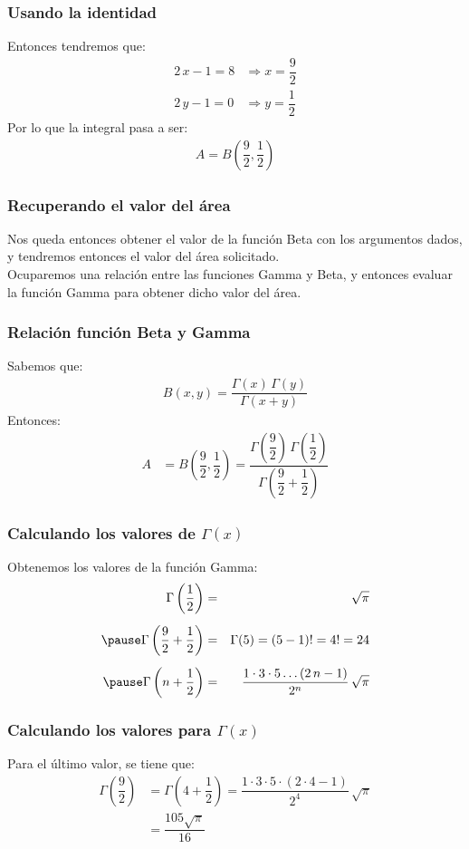 \begin{frame}
\frametitle{Usando la identidad}
Entonces tendremos que:
\begin{align*}
2 \, x - 1 = 8 &\Rightarrow x = \dfrac{9}{2} \\[0.5em]
2 \, y - 1 = 0 &\Rightarrow y = \dfrac{1}{2}
\end{align*}
\pause
Por lo que la integral pasa a ser:
\begin{align*}
A = B \left( \dfrac{9}{2},\dfrac{1}{2} \right)
\end{align*}
\end{frame}
\begin{frame}
\frametitle{Recuperando el valor del área}
Nos queda entonces obtener el valor de la función Beta con los argumentos dados, y tendremos entonces el valor del área solicitado.
\\
\bigskip
\pause
Ocuparemos una relación entre las funciones Gamma y Beta, y entonces evaluar la función Gamma para obtener dicho valor del área.
\end{frame}
\begin{frame}
\frametitle{Relación función Beta y Gamma}
Sabemos que:
\begin{align*}
B (x, y) = \dfrac{\Gamma (x) \, \Gamma (y)}{\Gamma (x + y)}
\end{align*}
\pause
Entonces:
\begin{align*}
A &= B \left( \dfrac{9}{2},\dfrac{1}{2} \right) = \dfrac{\Gamma \left(\dfrac{9}{2} \right) \, \Gamma \left(\dfrac{1}{2} \right)}{\Gamma \left(\dfrac{9}{2} + \dfrac{1}{2} \right)}
\end{align*}
\end{frame}
\begin{frame}
\frametitle{Calculando los valores de $\Gamma(x)$}
Obtenemos los valores de la función Gamma:
\begin{eqnarray*}
\Gamma \left( \dfrac{1}{2} \right) &=& \sqrt{\pi} \\[0.5em] \pause
\Gamma \left( \dfrac{9}{2} + \dfrac{1}{2} \right) &=& \Gamma (5) = (5 - 1)! = 4! = 24 \\[0.5em] \pause
\Gamma \left(n + \dfrac{1}{2}\right) &=& \dfrac{1 \cdot 3 \cdot 5 \ldots (2 \, n - 1)}{2^{n}} \, \sqrt{\pi} 
\end{eqnarray*}
\end{frame}
\begin{frame}
\frametitle{Calculando los valores para $\Gamma (x)$}
Para el último valor, se tiene que:
\begin{align*}
\Gamma \left( \dfrac{9}{2}\right) &=  \Gamma \left(4 + \dfrac{1}{2}\right) = \dfrac{1 \cdot 3 \cdot 5 \cdot (2 \cdot 4 - 1)}{2^{4}} \, \sqrt{\pi} \\[1em]
&= \dfrac{105 \sqrt{\pi}}{16}
\end{align*}
\end{frame}
